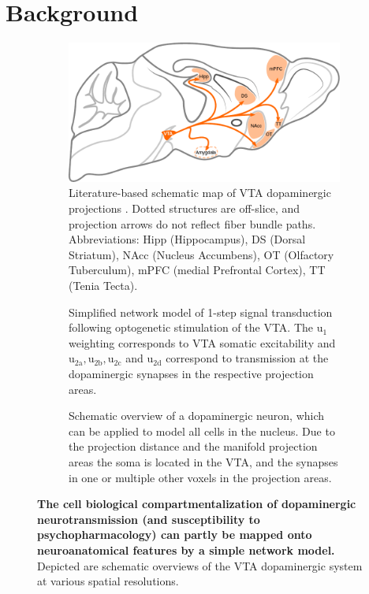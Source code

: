 \section{Background}

\begin{figure}[h!]
	\begin{subfigure}{.53\textwidth}
		\centering
		\includegraphics[width=\textwidth]{img/model_literature}
		\caption{
			Literature-based schematic map of VTA dopaminergic projections \cite{Aransay2015,Fields2007,Ikemoto2007,Hnasko2012,Pan2010}.
			Dotted structures are off-slice, and projection arrows do not reflect fiber bundle paths.
			Abbreviations: Hipp (Hippocampus), DS (Dorsal Striatum), NAcc (Nucleus Accumbens), OT (Olfactory Tuberculum), mPFC (medial Prefrontal Cortex), TT (Tenia Tecta).
			}
		\label{fig:ml}
	\end{subfigure}
	\begin{subfigure}{.45\textwidth}
		\centering
		\vspace{-1em}
		\vspace{-0.95em}
		\caption{
			Simplified network model of 1-step signal transduction following optogenetic stimulation of the VTA.
			The $\mathrm{u_1}$ weighting corresponds to VTA somatic excitability and $\mathrm{u_{2a},u_{2b},u_{2c}}$ and $\mathrm{u_{2d}}$ correspond to transmission at the dopaminergic synapses in the respective projection areas.
			}
		\label{fig:md}
	\end{subfigure}
	\begin{subfigure}{.96\textwidth}
		\centering
		\caption{
			Schematic overview of a dopaminergic neuron, which can be applied to model all cells in the nucleus.
			Due to the projection distance and the manifold projection areas the soma is located in the VTA, and the synapses in one or multiple other voxels in the projection areas.
			}
		\label{fig:nm}
	\end{subfigure}
	\caption{
		\textbf{The cell biological compartmentalization of dopaminergic neurotransmission (and susceptibility to psychopharmacology) can partly be mapped onto neuroanatomical features by a simple network model.}
		Depicted are schematic overviews of the VTA dopaminergic system at various spatial resolutions.
		}
	\label{fig:m}
\end{figure}

